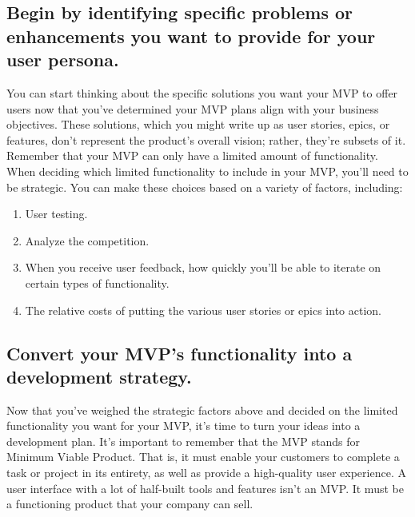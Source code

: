 \documentclass[paper=a4, fontsize=11pt]{scrartcl}
\numberwithin{equation}{section}		%
\numberwithin{figure}{section}			%
\numberwithin{table}{section}				%
\begin{document}
\subsection{Begin by identifying specific problems or enhancements you want to provide for your user persona.}
You can start thinking about the specific solutions you want your MVP to offer users now that you've determined your MVP plans align with your business objectives. These solutions, which you might write up as user stories, epics, or features, don't represent the product's overall vision; rather, they're subsets of it. Remember that your MVP can only have a limited amount of functionality.
When deciding which limited functionality to include in your MVP, you'll need to be strategic. You can make these choices based on a variety of factors, including:
\begin{enumerate}
    \item User testing.
    \item Analyze the competition.
    \item When you receive user feedback, how quickly you'll be able to iterate on certain types of functionality.
    \item The relative costs of putting the various user stories or epics into action.
\end{enumerate}
\newpage

\subsection{Convert your MVP's functionality into a development strategy.}
Now that you've weighed the strategic factors above and decided on the limited functionality you want for your MVP, it's time to turn your ideas into a development plan.
It's important to remember that the MVP stands for Minimum Viable Product. That is, it must enable your customers to complete a task or project in its entirety, as well as provide a high-quality user experience. A user interface with a lot of half-built tools and features isn't an MVP. It must be a functioning product that your company can sell.

\newpage

\end{document}
